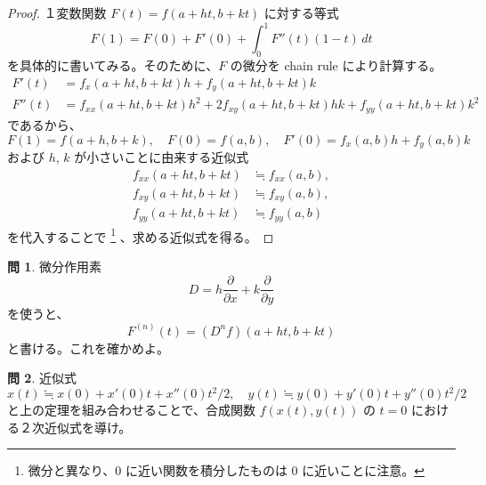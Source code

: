 \documentclass[a4paper]{jsarticle}
\theoremstyle{definition}
\newtheorem{Exercise}{問}%
\theoremstyle{remark}
\begin{document}
\begin{proof}
１変数関数 $F(t) = f(a+ht,b+kt)$ に対する等式
\[
F(1) = F(0) + F'(0) + \int_0^1 F''(t)(1-t)\, dt %
\]
を具体的に書いてみる。そのために、$F$ の微分を chain rule により計算する。
\begin{align*}
F'(t) &= f_x(a+ht,b+kt)h + f_y(a+ht,b+kt)k\\
F''(t) &= f_{xx}(a+ht,b+kt)h^2 + 2f_{xy}(a+ht,b+kt)hk + f_{yy}(a+ht,b+kt)k^2
\end{align*}
であるから、
\[
F(1) = f(a+h,b+k),
\quad
F(0) = f(a,b), 
\quad 
F'(0) = f_x(a,b)h + f_y(a,b)k
\]
および $h$, $k$ が小さいことに由来する近似式
\begin{align*}
f_{xx}(a+ht,b+kt) &\fallingdotseq f_{xx}(a,b),\\ 
f_{xy}(a+ht,b+kt) &\fallingdotseq f_{xy}(a,b),\\ 
f_{yy}(a+ht,b+kt) &\fallingdotseq f_{yy}(a,b)
\end{align*} 
を代入することで
\footnote{微分と異なり、$0$ に近い関数を積分したものは $0$ に近いことに注意。}
、求める近似式を得る。
\end{proof}

\begin{Exercise}
微分作用素
\[
D = h\frac{\partial}{\partial x} + k \frac{\partial}{\partial y}
\]
を使うと、
\[
F^{(n)}(t) = (D^nf)(a+ht,b+kt)
\]
と書ける。これを確かめよ。
\end{Exercise}

\begin{Exercise}
近似式
\[ 
x(t) \fallingdotseq x(0) + x'(0)t + x''(0) t^2/2, 
\quad 
y(t) \fallingdotseq y(0) + y'(0)t + y''(0) t^2/2 
\]
と上の定理を組み合わせることで、合成関数 $f(x(t),y(t))$ の $t=0$ における２次近似式を導け。
\end{Exercise} 
\end{document}
